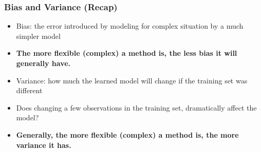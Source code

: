 \begin{frame}[fragile]\frametitle{Bias and Variance (Recap)}
\begin{itemize}
\item Bias: the error introduced by modeling for complex situation by a much simpler model
\item {\bf The more flexible (complex) a method is, the less bias it will generally have.}
\item Variance: how much the learned model will change if the training set was different 
\item Does changing a few observations in the training set, dramatically affect the model?
\item {\bf Generally, the more flexible (complex) a method is, the more variance it has.}
\end{itemize}
\end{frame}


%
%

